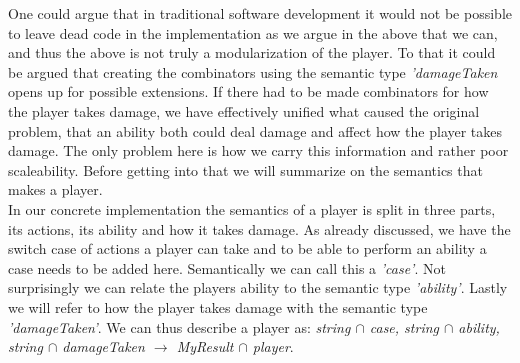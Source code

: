 One could argue that in traditional software development it would not be possible to leave dead code in the implementation as we argue in the above that we can, and thus the above is not truly a modularization of the player. To that it could be argued that creating the combinators using the semantic type \textit{'damageTaken} opens up for possible extensions. If there had to be made combinators for how the player takes damage, we have effectively unified what caused the original problem, that an ability both could deal damage and affect how the player takes damage. The only problem here is how we carry this information and rather poor scaleability. Before getting into that we will summarize on the semantics that makes a player.\\
In our concrete implementation the semantics of a player is split in three parts, its actions, its ability and how it takes damage. As already discussed, we have the switch case of actions a player can take and to be able to perform an ability a case needs to be added here. Semantically we can call this a \textit{'case'}. Not surprisingly we can relate the players ability to the semantic type \textit{'ability'}. Lastly we will refer to how the player takes damage with the semantic type \textit{'damageTaken'}. We can thus describe a player as: \textit{string $\cap$ case, string $\cap$ ability, string $\cap$ damageTaken $\to$ MyResult $\cap$ player}. 

